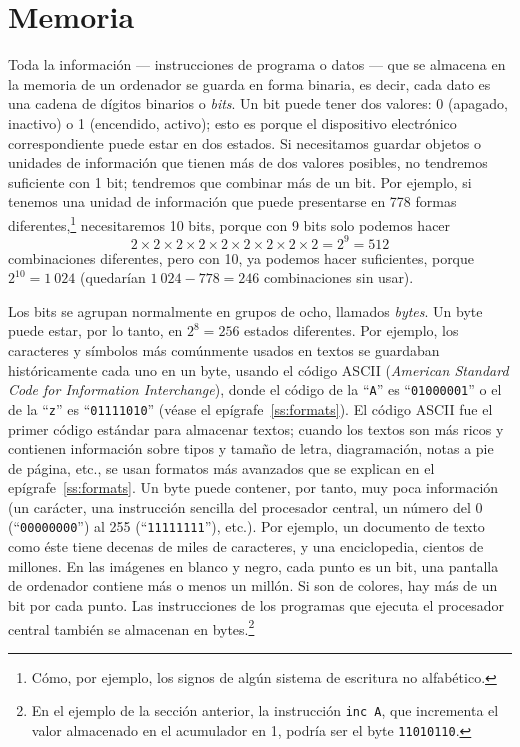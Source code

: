 \section{Memoria} \label{ss:memoria} 

Toda la información --- instrucciones de programa o datos --- que se almacena en la memoria de un ordenador se guarda en forma binaria, es decir, cada dato es una cadena de dígitos binarios o \emph{bits}. Un bit puede tener dos valores: 0 (apagado, inactivo) o 1 (encendido, activo); esto es porque el dispositivo electrónico correspondiente puede estar en dos estados. Si necesitamos guardar objetos o unidades de información que tienen más de dos valores posibles, no tendremos suficiente con 1 bit; tendremos que combinar más de un bit. Por ejemplo, si tenemos una unidad de información que puede presentarse en 778 formas diferentes,\footnote{Cómo, por ejemplo, los signos de algún sistema de escritura no alfabético.} necesitaremos 10 bits, porque con 9 bits solo podemos hacer $$2 \times 2 \times 2 \times 2 \times 2 \times 2 \times 2 \times 2 \times 2 = 2^9 = 512$$ combinaciones diferentes, pero con 10, ya podemos hacer suficientes, porque $2^{10}=1~024$ (quedarían $1~024-778=246$ combinaciones sin usar). 

Los bits se agrupan normalmente en grupos de ocho, llamados \emph{bytes}. Un byte puede estar, por lo tanto, en $2^8=256$ estados diferentes. Por ejemplo, los caracteres y símbolos más comúnmente usados en textos se guardaban históricamente cada uno en un byte, usando el código ASCII\label{pg:ASCII} (\emph{American Standard Code for Information Interchange}), donde el código de la ``{\tt A}'' es ``{\tt 01000001}'' o el de la ``{\tt z}'' es ``{\tt 01111010}'' (véase el epígrafe~\ref{ss:formats}). El código ASCII fue el primer código estándar para almacenar textos; cuando los textos son más ricos y contienen información sobre tipos y tamaño de letra, diagramación, notas a pie de página, etc., se usan formatos más avanzados que se explican en el epígrafe~\ref{ss:formats}. Un byte puede contener, por tanto, muy poca información (un carácter, una instrucción sencilla del procesador central, un número del 0 (``{\tt 00000000}'') al 255 (``{\tt 11111111}''), etc.). Por ejemplo, un documento de texto como éste tiene decenas de miles de caracteres, y una enciclopedia, cientos de millones. En las imágenes en blanco y negro, cada punto es un bit, una pantalla de ordenador contiene más o menos un millón. Si son de colores, hay más de un bit por cada punto. Las instrucciones de los programas que ejecuta el procesador central también se almacenan en bytes.\footnote{En el ejemplo de la sección anterior, la instrucción {\tt inc A}, que incrementa el valor almacenado en el acumulador en 1, podría ser el byte {\tt 11010110}.} 

